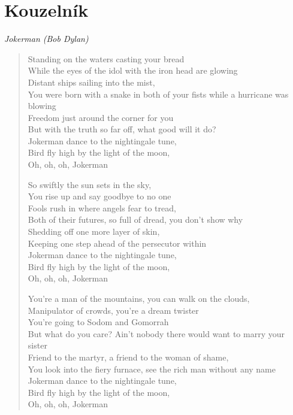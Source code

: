 \section*{Kouzelník}

\textit{Jokerman (Bob Dylan)}

\begin{verse}
Standing on the waters casting your bread \\
While the eyes of the idol with the iron head are glowing \\
Distant ships sailing into the mist, \\
You were born with a snake in both of your fists while a hurricane was blowing \\
Freedom just around the corner for you \\
But with the truth so far off, what good will it do? \\
Jokerman dance to the nightingale tune, \\
Bird fly high by the light of the moon, \\
Oh, oh, oh, Jokerman

So swiftly the sun sets in the sky, \\
You rise up and say goodbye to no one \\
Fools rush in where angels fear to tread, \\
Both of their futures, so full of dread, you don't show why \\
Shedding off one more layer of skin, \\
Keeping one step ahead of the persecutor within \\
Jokerman dance to the nightingale tune, \\
Bird fly high by the light of the moon, \\
Oh, oh, oh, Jokerman

You're a man of the mountains, you can walk on the clouds, \\
Manipulator of crowds, you're a dream twister \\
You're going to Sodom and Gomorrah \\
But what do you care? Ain't nobody there would want to marry your sister \\
Friend to the martyr, a friend to the woman of shame, \\
You look into the fiery furnace, see the rich man without any name \\
Jokerman dance to the nightingale tune, \\
Bird fly high by the light of the moon, \\
Oh, oh, oh, Jokerman


\end{verse}
